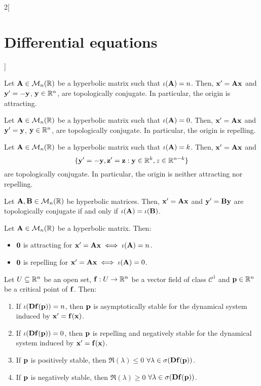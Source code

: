 \documentclass[../../../main.tex]{subfiles}
\begin{document}
\begin{multicols}{2}[\section{Differential equations}]
\begin{theorem}
    Let $\vf{A}\in\mathcal{M}_n(\RR)$ be a hyperbolic matrix such that $\iota(\vf{A})=n$. Then, $\vf{x}'=\vf{A}\vf{x}$ and $\vf{y}'=-\vf{y}$, $\vf{y}\in\RR^n$, are topologically conjugate. In particular, the origin is attracting.
  \end{theorem}
  \begin{corollary}
    Let $\vf{A}\in\mathcal{M}_n(\RR)$ be a hyperbolic matrix such that $\iota(\vf{A})=0$. Then, $\vf{x}'=\vf{A}\vf{x}$ and $\vf{y}'=\vf{y}$, $\vf{y}\in\RR^n$, are topologically conjugate. In particular, the origin is repelling.
  \end{corollary}
  \begin{corollary}
    Let $\vf{A}\in\mathcal{M}_n(\RR)$ be a hyperbolic matrix such that $\iota(\vf{A})=k$. Then, $\vf{x}'=\vf{A}\vf{x}$ and $$\{\vf{y}'=-\vf{y}, \vf{z}'=\vf{z}:\vf{y}\in\RR^k,{z}\in\RR^{n-k}\}$$ are topologically conjugate. In particular, the origin is neither attracting nor repelling.
  \end{corollary}
  \begin{theorem}
    Let $\vf{A},\vf{B}\in\mathcal{M}_n(\RR)$ be hyperbolic matrices. Then, $\vf{x}'=\vf{A}\vf{x}$ and $\vf{y}'=\vf{B}\vf{y}$ are topologically conjugate if and only if $\iota(\vf{A})=\iota(\vf{B})$.
  \end{theorem}
  \begin{corollary}
    Let $\vf{A}\in\mathcal{M}_n(\RR)$ be a hyperbolic matrix. Then:
    \begin{itemize}
      \item $\vf{0}$ is attracting for $\vf{x}'=\vf{A}\vf{x}\iff\iota(\vf{A})=n$.
      \item $\vf{0}$ is repelling for $\vf{x}'=\vf{A}\vf{x}\iff\iota(\vf{A})=0$.
    \end{itemize}
  \end{corollary}
  \begin{theorem}
    Let $U\subseteq \RR^n$ be an open set, $\vf{f}:U\rightarrow\RR^n$ be a vector field of class $\mathcal{C}^1$ and $\vf{p}\in\RR^n$ be a critical point of $\vf{f}$. Then:
    \begin{enumerate}
      \item If $\iota(\vf{Df}(\vf{p}))=n$, then $\vf{p}$ is asymptotically stable for the dynamical system induced by $\vf{x}'=\vf{f}(\vf{x})$.
      \item If $\iota(\vf{Df}(\vf{p}))=0$, then $\vf{p}$ is repelling and negatively stable for the dynamical system induced by $\vf{x}'=\vf{f}(\vf{x})$.
      \item If $\vf{p}$ is positively stable, then $\Re(\lambda)\leq 0$ $\forall\lambda\in\sigma(\vf{Df}(\vf{p}))$.
      \item If $\vf{p}$ is negatively stable, then $\Re(\lambda)\geq 0$ $\forall\lambda\in\sigma(\vf{Df}(\vf{p}))$.
    \end{enumerate}
  \end{theorem}
\end{multicols}
\end{document}
